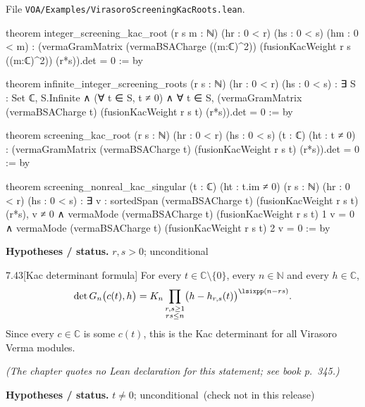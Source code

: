 \documentclass[11pt,openany]{book}
\newcommand{\leanpath}[1]{\texttt{\small #1}}
\theoremstyle{definition}
\theoremstyle{plain}
\newcommand{\C}{{\mathbb{C}}}
\newcommand{\N}{{\mathbb{N}}}
\begin{document}
{\raggedright\noindent File \leanpath{VOA/\allowbreak Examples/\allowbreak VirasoroScreeningKacRoots.lean}.\par}
\begin{leancode}
theorem integer_screening_kac_root (r s m : ℕ) (hr : 0 < r) (hs : 0 < s)
    (hm : 0 < m) :
    (vermaGramMatrix (vermaBSACharge ((m:ℂ)^2))
      (fusionKacWeight r s ((m:ℂ)^2)) (r*s)).det = 0 := by

theorem infinite_integer_screening_roots (r s : ℕ) (hr : 0 < r) (hs : 0 < s) :
    ∃ S : Set ℂ, S.Infinite ∧ (∀ t ∈ S, t ≠ 0) ∧
      ∀ t ∈ S, (vermaGramMatrix (vermaBSACharge t)
        (fusionKacWeight r s t) (r*s)).det = 0 := by

theorem screening_kac_root (r s : ℕ) (hr : 0 < r) (hs : 0 < s)
    (t : ℂ) (ht : t ≠ 0) :
    (vermaGramMatrix (vermaBSACharge t) (fusionKacWeight r s t) (r*s)).det = 0 := by

theorem screening_nonreal_kac_singular (t : ℂ) (ht : t.im ≠ 0)
    (r s : ℕ) (hr : 0 < r) (hs : 0 < s) :
    ∃ v : sortedSpan (vermaBSACharge t) (fusionKacWeight r s t) (r*s),
      v ≠ 0 ∧ vermaMode (vermaBSACharge t) (fusionKacWeight r s t) 1 v = 0 ∧
        vermaMode (vermaBSACharge t) (fusionKacWeight r s t) 2 v = 0 := by
\end{leancode}
\noindent\textbf{Hypotheses / status.} $r,s>0$; unconditional\par
\medskip
\begin{btheorem}{7.43}[Kac determinant formula]
For every $t\in\C\setminus\{0\}$, every $n\in\N$ and every $h\in\C$,
\begin{equation*}
 \det G_n\bigl(c(t),h\bigr) = K_n\prod_{\substack{r,s\ge1\\ rs\le n}}\bigl(h-h_{r,s}(t)\bigr)^{\lsixpp(n-rs)} .
\end{equation*}
Since every $c\in\C$ is some $c(t)$, this is the Kac determinant for all Virasoro Verma modules.
\end{btheorem}
\noindent\emph{(The chapter quotes no Lean declaration for this statement; see book p.~345.)}\par
\noindent\textbf{Hypotheses / status.} $t\ne0$; unconditional\ (check not in this release)\par
\medskip
\endgroup
\setcounter{chapter}{7}
\end{document}
